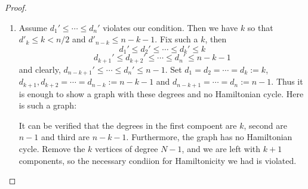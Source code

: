 \documentclass[12pt, a4paper]{book}
\theoremstyle{nonumberplain}
\newtheorem{proof}{Proof}
\begin{document}
\begin{proof}
\begin{enumerate}[label=(\roman*)]
            From the Ore proof argument, we know that $b$ has at least as many non-neighbours as many neighbours $a$ has, i.e. $h$.
            Each of these non-neighbours $x$ of $b$ could have been chosen for $a$ (as a non-adjacent pair for $b$), but it was not, do $d(x)\leq d(a)=h$.
            Thus there exists an index greater than or equal to $h$ with degree less than or equal to $h$.
            This exactly means $d_h\leq h$, and we have our claim.

            Thus by our condition, $d_{n-h}\geq n-h$, so there exist $h+1$ degrees $\geq n-h$.
            Then by the Pidgeonhole Principle, there exists at least one non-neighbour of $a$, call it $y$, that has degree $\geq n-h$.
            But then $a,y$ is a non-adjacent pair with $d(a)+d(y)\geq h+n-h=n>d(a)+d(b)$, a contradiction to the choice of $a,b$.
        \item Assume $d_1'\leq\cdots\leq d_n'$ violates our condition.
            Then we have $k$ so that $d'_k\leq k<n/2$ and $d'_{n-k}\leq n-k-1$.
            Fix such a $k$, then
            \[d_1'\leq d_2'\leq\cdots\leq d_k'\leq k\]
            \[d_{k+1}'\leq d_{k+2}'\leq\cdots\leq d_n'\leq n-k-1\]
            and clearly, $d_{n-k+1}'\leq\cdots\leq d_n'\leq n-1$.
            Set $d_1=d_2=\cdots=d_k:= k$, $d_{k+1},d_{k+2}=\cdots=d_{n-k}:=n-k-1$ and $d_{n-k+1}=\cdots=d_n:=n-1$.
            Thus it is enough to show a graph with these degrees and no Hamiltonian cycle.
            Here is such a graph:
            \begin{center}
            \end{center}
            It can be verified that the degrees in the first compoent are $k$, second are $n-1$ and third are $n-k-1$.
            Furthermore, the graph has no Hamiltonian cycle.
            Remove the $k$ vertices of degree $N-1$, and we are left with $k+1$ components, so the necessary condiion for Hamiltonicity we had is violated.
    \end{enumerate}
\end{proof}
\end{document}
